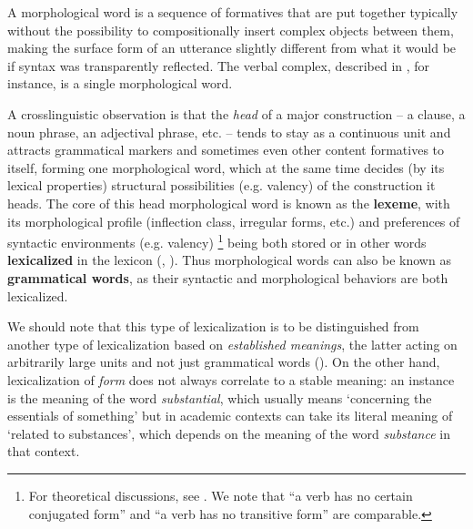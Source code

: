 \documentclass[UTF8, a4paper, oneside, scheme=plain, 12pt]{ctexrep}
\newcommand*{\concept}[1]{\textbf{#1}}
\newcommand*{\term}[1]{\emph{#1}}
\newcommand{\form}[1]{\emph{#1}}
\newcommand{\translate}[1]{`#1'}
\begin{document}
A morphological word is a sequence of formatives that are put together typically without the possibility to compositionally insert complex objects between them,
making the surface form of an utterance slightly different from what it would be if syntax was transparently reflected.
The verbal complex, described in ,
for instance, is a single morphological word.

A crosslinguistic observation is that the \emph{head} of a major construction -- a clause, a noun phrase, an adjectival phrase, etc. --
tends to stay as a continuous unit and attracts grammatical markers and sometimes even other content formatives to itself,
forming one morphological word,
which at the same time decides (by its lexical properties)
structural possibilities (e.g. valency) of the construction it heads.
The core of this head morphological word is known as the \concept{lexeme},
with its morphological profile (inflection class, irregular forms, etc.)
and preferences of syntactic environments (e.g. valency)%
\footnote{
    For theoretical discussions, see .
    We note that ``a verb has no certain conjugated form''
    and ``a verb has no transitive form'' are comparable.
}
being both stored or in other words \concept{lexicalized} in the lexicon (, ).
Thus morphological words can also be known as \concept{grammatical words},
as their syntactic and morphological behaviors are both lexicalized.

We should note that this type of lexicalization is to be distinguished from another type of lexicalization based on \emph{established meanings},
the latter acting on arbitrarily large units and not just grammatical words ().
On the other hand, lexicalization of \emph{form} does not always correlate to a stable meaning:
an instance is the meaning of the word \form{substantial},
which usually means \translate{concerning the essentials of something}
but in academic contexts can take its literal meaning of \translate{related to substances},
which depends on the meaning of the word \term{substance} in that context.
\end{document}
